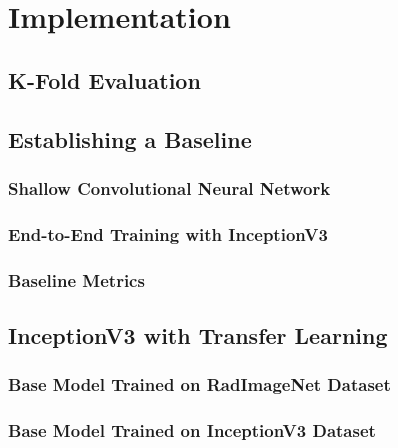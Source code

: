 \chapter{Implementation}\label{implementation}

\section{K-Fold Evaluation}





\section{Establishing a Baseline}

\subsection{Shallow Convolutional Neural Network}





\subsection{End-to-End Training with InceptionV3}





\subsection{Baseline Metrics}

\section{InceptionV3 with Transfer Learning}

\subsection{Base Model Trained on RadImageNet Dataset}



\subsection{Base Model Trained on InceptionV3 Dataset}

